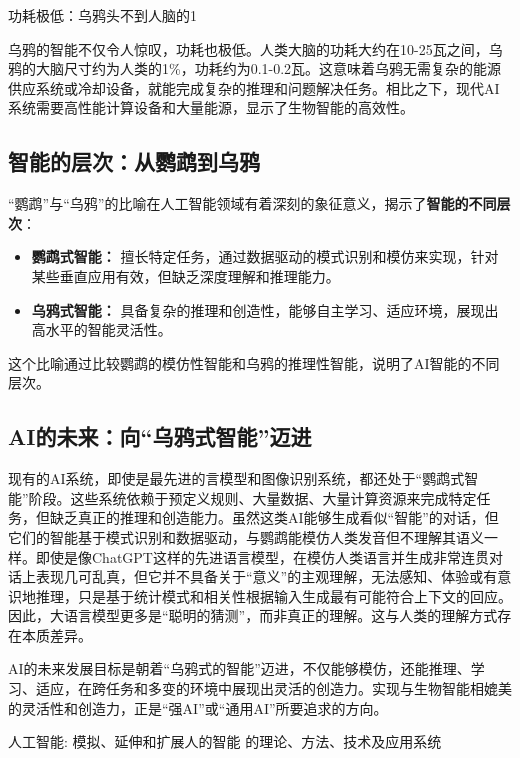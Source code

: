 功耗极低：乌鸦头不到人脑的1%

乌鸦的智能不仅令人惊叹，功耗也极低。人类大脑的功耗大约在10-25瓦之间，乌鸦的大脑尺寸约为人类的1\%，功耗约为0.1-0.2瓦。这意味着乌鸦无需复杂的能源供应系统或冷却设备，就能完成复杂的推理和问题解决任务。相比之下，现代AI系统需要高性能计算设备和大量能源，显示了生物智能的高效性。

\subsection*{智能的层次：从鹦鹉到乌鸦}
“鹦鹉”与“乌鸦”的比喻在人工智能领域有着深刻的象征意义，揭示了{\bf 智能的不同层次}：
\begin{itemize}
\item {\bf 鹦鹉式智能：} 擅长特定任务，通过数据驱动的模式识别和模仿来实现，针对某些垂直应用有效，但缺乏深度理解和推理能力。
\item {\bf 乌鸦式智能：} 具备复杂的推理和创造性，能够自主学习、适应环境，展现出高水平的智能灵活性。
\end{itemize}

这个比喻通过比较鹦鹉的模仿性智能和乌鸦的推理性智能，说明了AI智能的不同层次。

\subsection*{AI的未来：向“乌鸦式智能”迈进}
现有的AI系统，即使是最先进的言模型和图像识别系统，都还处于“鹦鹉式智能”阶段。这些系统依赖于预定义规则、大量数据、大量计算资源来完成特定任务，但缺乏真正的推理和创造能力。虽然这类AI能够生成看似“智能”的对话，但它们的智能基于模式识别和数据驱动，与鹦鹉能模仿人类发音但不理解其语义一样。即使是像ChatGPT这样的先进语言模型，在模仿人类语言并生成非常连贯对话上表现几可乱真，但它并不具备关于“意义”的主观理解，无法感知、体验或有意识地推理，只是基于统计模式和相关性根据输入生成最有可能符合上下文的回应。因此，大语言模型更多是“聪明的猜测”，而非真正的理解。这与人类的理解方式存在本质差异。


AI的未来发展目标是朝着“乌鸦式的智能”迈进，不仅能够模仿，还能推理、学习、适应，在跨任务和多变的环境中展现出灵活的创造力。实现与生物智能相媲美的灵活性和创造力，正是“强AI”或“通用AI”所要追求的方向。


人工智能:		模拟、延伸和扩展人的智能   的理论、方法、技术及应用系统


\newpage
